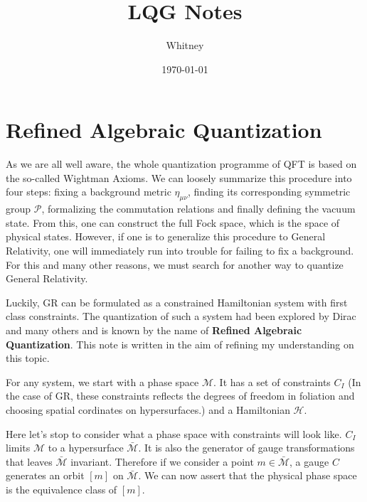 \documentclass{article}
\title{LQG Notes}
\author{Whitney}
\date{\today}
\begin{document}
\maketitle
\tableofcontents

\section{Refined Algebraic Quantization}


As we are all well aware, the whole quantization programme of QFT is based on the so-called Wightman Axioms. We can loosely summarize this procedure into four steps: fixing a background metric $\eta_{\mu\nu}$, finding its corresponding symmetric group $\mathcal{P}$, formalizing the commutation relations and finally defining the vacuum state. From this, one can construct the full Fock space, which is the space of physical states. However, if one is to generalize this procedure to General Relativity, one will immediately run into trouble for failing to fix a background. For this and many other reasons, we must search for another way to quantize General Relativity.

Luckily, GR can be formulated as a constrained Hamiltonian system with first class constraints. The quantization of such a system had been explored by Dirac and many others and is known by the name of \textbf{Refined Algebraic Quantization}. This note is written in the aim of refining my understanding on this topic.

For any system, we start with a phase space $\mathcal{M}$. It has a set of constraints $C_I$ (In the case of GR, these constraints reflects the degrees of freedom in foliation and choosing spatial cordinates on hypersurfaces.) and a Hamiltonian $\mathcal{H}$.

Here let's stop to consider what a phase space with constraints will look like. $C_I$ limits $\mathcal{M}$ to a hypersurface $\bar{\mathcal{M}}$. It is also the generator of gauge transformations that leaves $\bar{\mathcal{M}}$ invariant. Therefore if we consider a point $m \in \bar{\mathcal{M}}$, a gauge $C$ generates an orbit $[m]$ on $\bar{\mathcal{M}}$. We can now assert that the physical phase space is the equivalence class of $[m]$.
\end{document}
